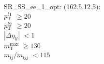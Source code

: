 SR\_SS\_ee\_1\_opt: (162.5,12.5): \\
$p_{\text{T}}^{l1}$ $\geq 20$ \\
$p_{\text{T}}^{l2}$ $\geq 20$ \\
$|\Delta\eta_{ll}|$ $<1$ \\
$m_{\text{T}}^{\text{max}}$ $\geq 130$ \\
$m_{lj}$/$m_{ljj}$ $<115$ \\
